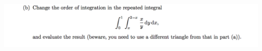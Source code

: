 \documentclass[12pt]{article}
\begin{document}
\begin{mdframed}
\includegraphics[width=400pt]{img/oxford-prelims-M5-multivariable-calc-1-4-b.png}
\end{mdframed}

\section{}
\end{document}
